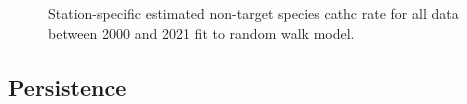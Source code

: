 \documentclass[12pt]{article}\usepackage[]{graphicx}\usepackage[]{color}
\begin{document}
\begin{figure}[htb]

{\centering {} 

}

\caption{Station-specific estimated non-target species cathc rate for all data between 2000 and 2021 fit to random walk model.}\label{fig:non-target-spat}
\end{figure}
\hypertarget{persistence}{%
\subsection{Persistence}\label{persistence}}
\end{document}
